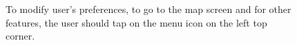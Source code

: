 \documentclass[12pt,titlepage]{article}
\begin{document}
\begin{figure}
\centering
{}
\caption{To modify user's preferences, to go to the map screen and for other features, the user should tap on the menu icon on the left top corner.}
\end{figure}
\clearpage
\newpage
\end{document}
